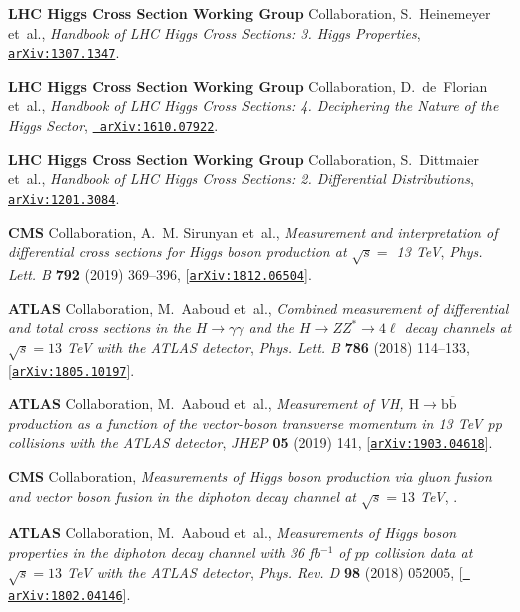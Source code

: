 \documentclass[11pt,a4paper]{article}
\numberwithin{equation}{section}
\numberwithin{figure}{section}
\numberwithin{table}{section}
\begin{document}
\begin{thebibliography}{100}
{\bf LHC Higgs Cross Section Working Group} Collaboration, S.~Heinemeyer
  et~al., {\it {Handbook of LHC Higgs Cross Sections: 3. Higgs Properties}},
  \href{http://arxiv.org/abs/1307.1347}{{\tt arXiv:1307.1347}}.

{\bf LHC Higgs Cross Section Working Group} Collaboration, D.~de~Florian
  et~al., {\it {Handbook of LHC Higgs Cross Sections: 4. Deciphering the Nature
  of the Higgs Sector}},  \href{http://arxiv.org/abs/1610.07922}{{\tt
  arXiv:1610.07922}}.

{\bf LHC Higgs Cross Section Working Group} Collaboration, S.~Dittmaier et~al.,
  {\it {Handbook of LHC Higgs Cross Sections: 2. Differential Distributions}},
  \href{http://arxiv.org/abs/1201.3084}{{\tt arXiv:1201.3084}}.

{\bf CMS} Collaboration, A.~M. Sirunyan et~al., {\it {Measurement and
  interpretation of differential cross sections for Higgs boson production at
  $\sqrt{s} =$ 13 TeV}},  {\em Phys. Lett. B} {\bf 792} (2019) 369--396,
  [\href{http://arxiv.org/abs/1812.06504}{{\tt arXiv:1812.06504}}].

{\bf ATLAS} Collaboration, M.~Aaboud et~al., {\it {Combined measurement of
  differential and total cross sections in the $H \rightarrow \gamma \gamma$
  and the $H \rightarrow ZZ^* \rightarrow 4\ell$ decay channels at $\sqrt{s} =
  13$ TeV with the ATLAS detector}},  {\em Phys. Lett. B} {\bf 786} (2018)
  114--133, [\href{http://arxiv.org/abs/1805.10197}{{\tt arXiv:1805.10197}}].

{\bf ATLAS} Collaboration, M.~Aaboud et~al., {\it {Measurement of VH, $
  \mathrm{H}\to \mathrm{b}\overline{\mathrm{b}} $ production as a function of
  the vector-boson transverse momentum in 13 TeV pp collisions with the ATLAS
  detector}},  {\em JHEP} {\bf 05} (2019) 141,
  [\href{http://arxiv.org/abs/1903.04618}{{\tt arXiv:1903.04618}}].

{\bf CMS} Collaboration, {\it {Measurements of Higgs boson production via gluon
  fusion and vector boson fusion in the diphoton decay channel at $\sqrt{s} =
  13$ TeV}}, .

{\bf ATLAS} Collaboration, M.~Aaboud et~al., {\it {Measurements of Higgs boson
  properties in the diphoton decay channel with 36 fb$^{-1}$ of $pp$ collision
  data at $\sqrt{s} = 13$ TeV with the ATLAS detector}},  {\em Phys. Rev. D}
  {\bf 98} (2018) 052005, [\href{http://arxiv.org/abs/1802.04146}{{\tt
  arXiv:1802.04146}}].


\end{thebibliography}
\end{document}
